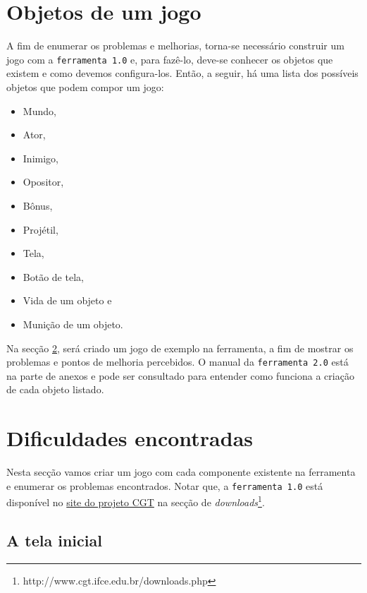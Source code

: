 \documentclass[12pt,twoside,openright,a4paper,english,brazil,sumario=tradicional]{abntex2}
\begin{document}
\section{Objetos de um jogo}
\label{sec:objetos}

A fim de enumerar os problemas e melhorias, torna-se necessário construir um jogo com a \texttt{ferramenta 1.0} e, para fazê-lo, deve-se conhecer os objetos que existem e como devemos configura-los. Então, a seguir, há uma lista dos possíveis objetos que podem compor um jogo:

\begin{itemize}
	\item Mundo,
	\item Ator,
	\item Inimigo,
	\item Opositor,
	\item Bônus,
	\item Projétil,
	\item Tela,
	\item Botão de tela,
	\item Vida de um objeto e
	\item Munição de um objeto.
\end{itemize}

Na secção \ref{sec:dificuldades}, será criado um jogo de exemplo na ferramenta, a fim de mostrar os problemas e pontos de melhoria percebidos. O manual da \texttt{ferramenta 2.0} está na parte de anexos e pode ser consultado para entender como funciona a criação de cada objeto listado.

\section{Dificuldades encontradas}
\label{sec:dificuldades}
Nesta secção vamos criar um jogo com cada componente existente na ferramenta e enumerar os problemas encontrados. Notar que, a \texttt{ferramenta 1.0} está disponível no \href{http://www.cgt.ifce.edu.br/downloads.php}{site do projeto CGT} na secção de \emph{downloads}\footnote{http://www.cgt.ifce.edu.br/downloads.php}.

\subsection{A tela inicial}
\end{document}
